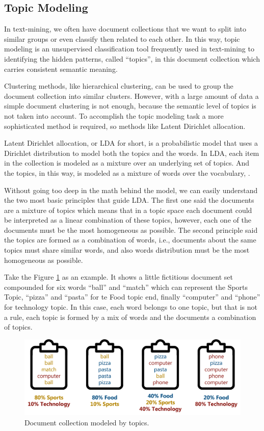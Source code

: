 	\subsection{Topic Modeling}
	
	In text-mining, we often have document collections that we want to split into similar groups or even classify then related to each other. In this way, topic modeling is an unsupervised classification tool frequently used in text-mining to identifying the hidden patterns, called ``topics'', in this document collection which carries consistent semantic meaning.
	
	Clustering methods, like hierarchical clustering, can be used to group the document collection into similar clusters. However, with a large amount of data a simple document clustering is not enough, because the semantic level of topics is not taken into account. To accomplish the topic modeling task a more sophisticated method is required, so methods like Latent Dirichlet allocation.
	
	Latent Dirichlet allocation, or LDA for short, is a probabilistic model that uses a Dirichlet distribution to model both the topics and the words. In LDA, each item in the collection is modeled as a mixture over an underlying set of topics. And the topics, in this way, is modeled as a mixture of words over the vocabulary, \cite{blei2003latent}.
	
	Without going too deep in the math behind the model, we can easily understand the two most basic principles that guide LDA. The first one said the documents are a mixture of topics which means that in a topic space each document could be interpreted as a linear combination of these topics, however, each one of the documents must be the most homogeneous as possible. The second principle said the topics are formed as a combination of words, i.e., documents about the same topics must share similar words, and also words distribution must be the most homogeneous as possible.
	
	Take the Figure \ref{fig:topicmodeling} as an example. It shows a little fictitious document set compounded for six words ``ball'' and ``match'' which can represent the Sports Topic, ``pizza'' and ``pasta'' for te Food topic end, finally ``computer'' and ``phone'' for technology topic. In this case, each word belongs to one topic, but that is not a rule, each topic is formed by a mix of words and the documents a combination of topics.
	
	\begin{figure}[h!]
		\centering
		\includegraphics[width=\linewidth]{01.Chapters/02.Background/topic_modeling}
		\caption{Document collection modeled by topics.}
		\label{fig:topicmodeling}
	\end{figure}
	

